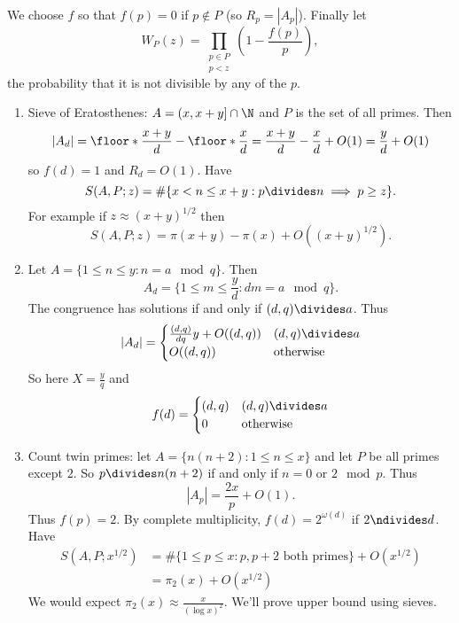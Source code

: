 \documentclass[a4paper]{article}
\theoremstyle{definition}
\begin{document}
We choose \(f\) so that \(f(p) = 0\) if \(p \notin P\) (so \(R_p = |A_p|\)). Finally let
\[
  W_P(z) = \prod_{\substack{p \in P \\ p < z}} \left( 1 - \frac{f(p)}{p} \right),
\]
the probability that it is not divisible by any of the \(p\).

\begin{eg}\leavevmode
  \begin{enumerate}
  \item Sieve of Eratosthenes: \(A = (x, x + y] \cap \N\) and \(P\) is the set of all primes. Then
    \[
      |A_d|
      = \floor*{\frac{x + y}{d}} - \floor*{\frac{x}{d}}
      = \frac{x + y}{d} - \frac{x}{d} + O(1)
      = \frac{y}{d} + O(1)
    \]
    so \(f(d) = 1\) and \(R_d = O(1)\). Have
    \[
      S(A, P; z) = \#\{x < n \leq x + y: p \divides n \implies p \geq z\}.
    \]
    For example if \(z \approx (x + y)^{1/2}\) then
    \[
      S(A, P; z) = \pi(x + y) - \pi(x) + O((x + y)^{1/2}).
    \]
  \item Let \(A = \{1 \leq n \leq y: n = a \mod q\}\). Then
    \[
      A_d = \{1 \leq m \leq \frac{y}{d}: dm = a \mod q\}.
    \]
    The congruence has solutions if and only if \((d, q) \divides a\). Thus
    \[
      |A_d| =
      \begin{cases}
        \frac{(d, q)}{dq} y + O((d, q)) & (d, q) \divides a \\
        O((d, q)) & \text{otherwise}
      \end{cases}
    \]
    So here \(X = \frac{y}{q}\) and
    \[
      f(d) =
      \begin{cases}
        (d, q) & (d, q) \divides a \\
        0 & \text{otherwise}
      \end{cases}
    \]
  \item Count twin primes: let \(A = \{n (n + 2): 1 \leq n \leq x\}\) and let \(P\) be all primes except \(2\). So \(p \divides n(n + 2)\) if and only if \(n = 0 \text{ or } 2 \mod p\). Thus
    \[
      |A_p| = \frac{2x}{p} + O(1).
    \]
    Thus \(f(p) = 2\). By complete multiplicity, \(f(d) = 2^{\omega(d)}\) if \(2 \ndivides d\). Have
    \begin{align*}
      S(A, P; x^{1/2})
      &= \#\{1 \leq p \leq x: p, p + 2 \text{ both primes}\} + O(x^{1/2}) \\
      &= \pi_2(x) + O(x^{1/2})
    \end{align*}
    We would expect \(\pi_2(x) \approx \frac{x}{(\log x)^2}\). We'll prove upper bound using sieves.
  \end{enumerate}
\end{eg}
\end{document}
